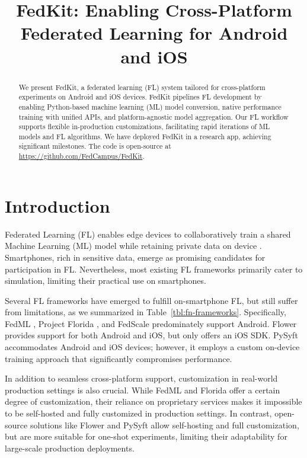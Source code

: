 \documentclass[letterpaper]{article} %
\title{FedKit: Enabling Cross-Platform Federated Learning for Android and iOS}
\author{}
\begin{document}
\maketitle

\begin{abstract}
    We present FedKit, a federated learning (FL) system tailored for
    cross-platform experiments on Android and iOS devices.
    FedKit pipelines FL development by
    enabling Python-based machine learning (ML) model conversion,
    native performance training with unified APIs,
    and platform-agnostic model aggregation.
    Our FL workflow supports flexible in-production customizations,
    facilitating rapid iterations of ML models and FL algorithms.
    We have deployed FedKit in a research app,
    achieving significant milestones.
    The code is open-source at \url{https://github.com/FedCampus/FedKit}.
\end{abstract}

\section{Introduction}

Federated Learning (FL) enables edge devices to
collaboratively train a shared Machine Learning (ML) model while
retaining private data on device \cite{mcmahan2017communication}.
Smartphones, rich in sensitive data,
emerge as promising candidates for participation in FL.
Nevertheless, most existing FL frameworks
\cite[e.g.,][]{bonawitz2019towards,liu2021fate,ma2019paddlepaddle,openfl_citation}
primarily cater to simulation,
limiting their practical use on smartphones.

Several FL frameworks have emerged to fulfill on-smartphone FL,
but still suffer from limitations,
as we summarized in Table~\ref{tbl:fn-frameworks}.
Specifically, FedML \cite{he2020fedml},
Project Florida \cite{madrigal2023project},
and FedScale \cite{lai2022fedscale} predominately support Android.
Flower \cite{beutel2020flower,mathur2021ondevice} provides
support for both Android and iOS, but only offers an iOS SDK.
PySyft \cite{ryffel2018generic,Ziller2021,hall2021syft}
accommodates Android and iOS devices;
however, it employs a custom on-device training approach that
significantly compromises performance.

In addition to seamless cross-platform support,
customization in real-world production settings is also crucial.
While FedML and Florida offer a certain degree of customization,
their reliance on proprietary services makes it impossible to be self-hosted and
fully customized in production settings.
In contrast, open-source solutions like Flower and PySyft allow
self-hosting and full customization,
but are more suitable for one-shot experiments,
limiting their adaptability for large-scale production deployments.
\end{document}
